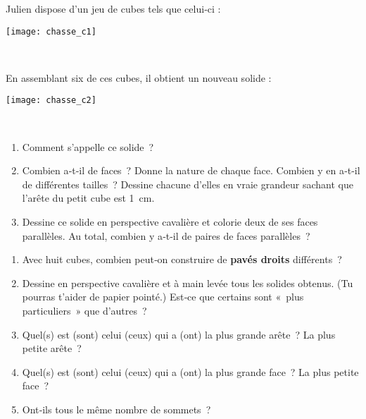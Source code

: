 \begin{activite}

\begin{partie}
\begin{minipage}[c]{0.58\linewidth}
Julien dispose d'un jeu de cubes tels que celui‑ci : 
 \end{minipage} \hfill%
\begin{minipage}[c]{0.38\linewidth}
\texttt{[image: chasse\_c1]}
 \end{minipage} \\
\begin{minipage}[c]{0.7\linewidth}
En assemblant six de ces cubes, il obtient un nouveau solide : 
 \end{minipage} \hfill%
\begin{minipage}[c]{0.26\linewidth}
\texttt{[image: chasse\_c2]}
 \end{minipage} \\
\begin{enumerate}
 \item Comment s'appelle ce solide ?
 \item Combien a‑t‑il de faces ? Donne la nature de chaque face. Combien y en a‑t‑il de différentes tailles ? Dessine chacune d'elles en vraie grandeur sachant que l'arête du petit cube est 1 cm.
 \item Dessine ce solide en perspective cavalière et colorie deux de ses faces parallèles. Au total, combien y a‑t‑il de paires de faces parallèles ?
 \end{enumerate}
\end{partie}

\begin{partie}
\begin{enumerate}
 \item Avec huit cubes, combien peut‑on construire de \textbf{pavés droits} différents ?
 \item Dessine en perspective cavalière et à main levée tous les solides obtenus. (Tu pourras t'aider de papier pointé.) Est‑ce que certains sont « plus particuliers » que d'autres ?
 \item Quel(s) est (sont) celui (ceux) qui a (ont) la plus grande arête ? La plus petite arête ?
 \item Quel(s) est (sont) celui (ceux) qui a (ont) la plus grande face ? La plus petite face ?
 \item Ont‑ils tous le même nombre de sommets ?
 \end{enumerate}
\end{partie}

\end{activite}

